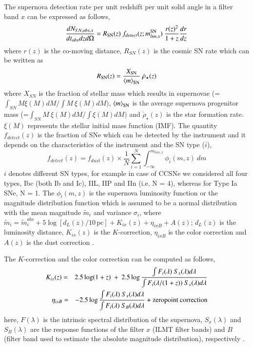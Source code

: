 \documentclass[useAMS,usenatbib]{mnras}
\begin{document}
The supernova detection rate per unit redshift per unit solid angle in a filter band $x$ 
can be expressed as follows,
\begin{equation}
\frac{dN_{SN,obs,x}}{dt_{obs}dzd\Omega} = R_{\rm SN}(z) \ f_{detect}(z;m_{lim, x}^{\rm SN}) \
\frac{r(z)^2}{1+z} \frac{dr}{dz} 
\end{equation}
where $r(z)$ is the co-moving distance, $R_{SN}(z)$ is the cosmic SN rate which can be 
written as 
\begin{equation}
R_{\rm SN}(z) = \frac{X_{\rm SN}}{\left<m\right>_{\rm SN}} \ \dot\rho_\star(z)
\end{equation}
where $X_{SN}$ is the fraction of stellar mass which results in supernovae
(=$\int_{SN} M \xi(M) dM \bigg/ \int M \ \xi(M) dM)$, $\left<m\right>_{\rm SN}$ is the average supernova 
progenitor mass  (=$\int_{SN} M \ \xi(M) dM \bigg/ \int \xi(M) dM)$ and $\dot\rho_\star(z)$ is the star 
formation rate. $\xi(M)$ represents the stellar initial mass function (IMF).
The quantity $f_{detect}(z)$ is the fraction of SNe which can be detected by the instrument and 
it depends on the characteristics of the instrument and the SN type ($i$), 
\begin{equation}
f_{detect}(z) =  f_{dust}(z) \times \frac{1}{N} \sum_{i=1}^{N} \int^{m_{lim,x}}_{-\infty} \phi_i(m, z) \ dm 
\end{equation}
$i$ denotes different SN types, for example in case of CCSNe we considered all four types, 
Ibc (both Ib and Ic), IIL, IIP and IIn (i.e. N = 4), whereas for Type Ia SNe, N = 1. 
The $\phi_i(m,z)$ is the supernova luminosity function or the magnitude distribution function which is assumed 
to be a normal distribution with the mean magnitude $\tilde{m}_i$ and variance $\sigma_i$, 
where $\tilde{m}_i = \tilde{m}_i^{abs} + 5 \log[{d_L(z)}/10\, \text{pc}] + K_{ix}(z) + \eta_{ixB} 
+ A(z)$; $d_L(z) $ is the luminosity distance, $K_{ix}(z)$ is the $K$-correction, $\eta_{ixB}$ is the color 
correction and $A(z)$ is the dust correction \citep[for details see,][]{2009JCAP...01..047L}. 

The $K$-correction and the color correction can be computed as follows,
\begin{eqnarray}
\begin{aligned}
K_{ix}(z) &=& 2.5\log(1+z) \ + \ 2.5\log \frac{\int F_i(\lambda) \ S_x(\lambda) d\lambda}{\int F_i(\lambda/(1+z)) \ S_x(\lambda) d\lambda} 
\end{aligned} \\
\begin{aligned}
\eta_{ixB} &=& -2.5\log \frac{\int F_i(\lambda) \ S_x(\lambda) d\lambda}{\int F_i(\lambda) \ S_B(\lambda) d\lambda} + {\rm zeropoint \ correction}
\end{aligned}
\end{eqnarray}
here, $F(\lambda)$ is the intrinsic spectral distribution of the supernova, $S_x(\lambda)$ and $S_B(\lambda)$ are 
the response functions of the filter $x$ (ILMT filter bands) and $B$ (filter band used to estimate the absolute 
magnitude distribution), respectively \citep[for more details see][]{2009JCAP...01..047L}.
\end{document}
